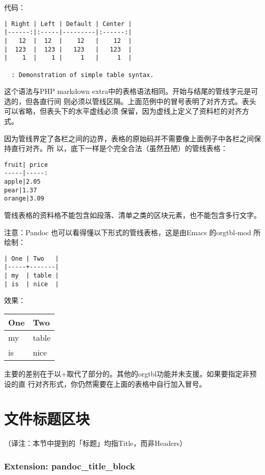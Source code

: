\documentclass[fancyhdr,bookmark]{ctexbook}
\begin{document}
代码：

\begin{lstlisting}
| Right | Left | Default | Center |
|------:|:-----|---------|:------:|
|   12  |  12  |    12   |    12  |
|  123  |  123 |   123   |   123  |
|    1  |    1 |     1   |     1  |

  : Demonstration of simple table syntax.
\end{lstlisting}

这个语法与PHP markdown
extra中的表格语法相同。开始与结尾的管线字元是可选的，但各直行间
则必须以管线区隔。上面范例中的冒号表明了对齐方式。表头可以省略，但表头下的水平虚线必须
保留，因为虚线上定义了资料栏的对齐方式。

因为管线界定了各栏之间的边界，表格的原始码并不需要像上面例子中各栏之间保持直行对齐。所
以，底下一样是个完全合法（虽然丑陋）的管线表格：

\begin{lstlisting}
fruit| price
-----|-----:
apple|2.05
pear|1.37
orange|3.09
\end{lstlisting}

管线表格的资料格不能包含如段落、清单之类的区块元素，也不能包含多行文字。

注意：Pandoc 也可以看得懂以下形式的管线表格，这是由Emacs 的orgtbl-mod
所绘制：

\begin{lstlisting}
| One | Two   |
|-----+-------|
| my  | table |
| is  | nice  |
\end{lstlisting}

效果：

\begin{longtable}[]{@{}ll@{}}
\toprule
One & Two\tabularnewline
\midrule
\endhead
my & table\tabularnewline
is & nice\tabularnewline
\bottomrule
\end{longtable}

主要的差别在于以+取代了部分的\textbar{}。其他的orgtbl功能并未支援。如果要指定非预设的直
行对齐形式，你仍然需要在上面的表格中自行加入冒号。

\section{文件标题区块}\label{ux6587ux4ef6ux6807ux9898ux533aux5757}

（译注：本节中提到的「标题」均指Title，而非Headers）

\subsubsection{Extension:
pandoc\_title\_block}\label{extension-pandoc_title_block}
\end{document}
